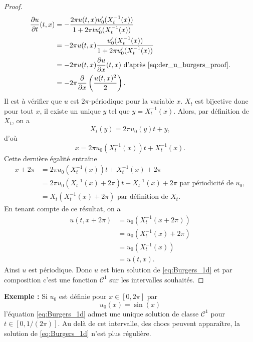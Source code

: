 \begin{proof}
\begin{align*}
\dfrac{\partial u}{\partial t}(t,x) & = - \dfrac{2 \pi u(t,x) u_0'(X_t^{-1}(x))}{1 + 2 \pi t u_0'(X_t^{-1}(x))} \\
	& = - 2 \pi u(t,x) \dfrac{u_0'(X_t^{-1}(x))}{1 + 2 \pi u_0'(X_t^{-1}(x))} \\
	& = - 2 \pi u(t,x) \dfrac{\partial u}{\partial x}(t,x) \text{ d'après \eqref{eq:der_u_burgers_proof}.} \\
	& = - 2 \pi \dfrac{\partial}{\partial x}\left( \dfrac{u(t,x)^2}{2} \right).
\end{align*}
Il est à vérifier que $u$ est $2 \pi$-périodique pour la variable $x$.
$X_t$ est bijective donc pour tout $x$, il existe un unique $y$ tel que $y = X_t^{-1}(x)$. Alors, par définition de $X_t$, on a
\begin{equation}
X_t(y) = 2 \pi u_0(y)t + y,
\end{equation}
d'où
\begin{equation}
x = 2 \pi u_0(X_t^{-1}(x))t + X_t^{-1}(x).
\end{equation}
Cette dernière égalité entraîne 
\begin{align*}
x + 2 \pi & = 2 \pi u_0( X_t^{-1}(x))t + X_t^{-1}(x) + 2 \pi \\
	& = 2 \pi u_0( X_t^{-1}(x) + 2 \pi)t + X_t^{-1}(x) + 2 \pi \text{ par périodicité de } u_0,\\
	& = X_t(X_t^{-1}(x) + 2 \pi) \text{ par définition de } X_t.
\end{align*}
En tenant compte de ce résultat, on a
\begin{align*}
u(t,x+ 2 \pi) & = u_0(X_t^{-1}(x+2\pi)) \\
	& = u_0(X_t^{-1}(x) + 2 \pi) \\
	& = u_0(X_t^{-1}(x)) \\
	& = u(t,x).
\end{align*}
Ainsi $u$ est périodique. Donc $u$ est bien solution de \eqref{eq:Burgers_1d} et par composition c'est une fonction $\mathcal{C}^1$ sur les intervalles souhaités.
\end{proof}

\textbf{Exemple : }
Si $u_0$ est définie pour $x \in [0, 2 \pi]$ par 
\begin{equation}
u_0(x) = \sin (x)
\label{eq:burgers_expemple2}
\end{equation}
l'équation \eqref{eq:Burgers_1d} admet une unique solution de classe $\mathcal{C}^1$ pour $t \in [0, 1/(2\pi)]$. Au delà de cet intervalle, des chocs peuvent apparaître, la solution de \eqref{eq:Burgers_1d} n'est plus régulière.


